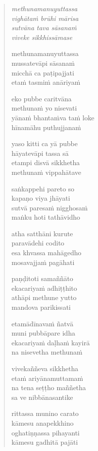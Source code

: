 

\cleartoverso

\vspace*{30mm}

\begin{verse}

\emph{methunamanuyuttassa}\\
\emph{vighātaṁ brūhi mārisa}\\
\emph{sutvāna tava sāsanaṁ}\\
\emph{viveke sikkhissāmase}

methunamanuyuttassa\\
mussatevāpi sāsanaṁ\\
micchā ca paṭipajjati\\
etaṁ tasmiṁ anāriyaṁ

eko pubbe caritvāna\\
methunaṁ yo nisevati\\
yānaṁ bhantaṁva taṁ loke\\
hīnamāhu puthujjanaṁ

yaso kitti ca yā pubbe\\
hāyatevāpi tassa sā\\
etampi disvā sikkhetha\\
methunaṁ vippahātave

saṅkappehi pareto so\\
kapaṇo viya jhāyati\\
sutvā paresaṁ nigghosaṁ\\
maṅku hoti tathāvidho

atha satthāni kurute\\
paravādehi codito\\
esa khvassa mahāgedho\\
mosavajjaṁ pagāhati

paṇḍitoti samaññāto\\
ekacariyaṁ adhiṭṭhito\\
athāpi methune yutto\\
mandova parikissati

etamādīnavaṁ ñatvā\\
muni pubbāpare idha\\
ekacariyaṁ daḷhaṁ kayirā\\
na nisevetha methunaṁ

vivekaññeva sikkhetha\\
etaṁ ariyānamuttamaṁ\\
na tena seṭṭho maññetha\\
sa ve nibbānasantike

rittassa munino carato\\
kāmesu anapekkhino\\
oghatiṇṇassa pihayanti\\
kāmesu gadhitā pajāti

\end{verse}

